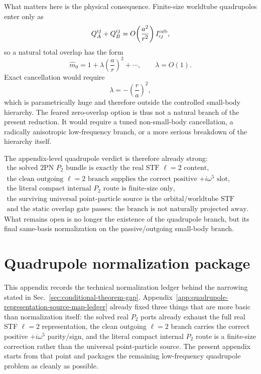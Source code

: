 \documentclass[11pt]{article}
\begin{document}
What matters here is the physical consequence.  Finite-size worldtube
quadrupoles enter only as
\[
Q_A^{ij}+Q_B^{ij}=O\!\left(\frac{a^2}{r^2}\right)I_{ij}^{\rm orb},
\]
so a natural total overlap has the form
\[
\hat m_0
=
1+\lambda\left(\frac{a}{r}\right)^2+\cdots,
\qquad \lambda=O(1).
\]
Exact cancellation would require
\[
\lambda=-\left(\frac{r}{a}\right)^2,
\]
which is parametrically huge and therefore outside the controlled small-body
hierarchy.  The feared zero-overlap option is thus not a natural branch of the
present reduction.  It would require a tuned non-small-body cancellation, a
radically anisotropic low-frequency branch, or a more serious breakdown of the
hierarchy itself.

The appendix-level quadrupole verdict is therefore already strong:
\[
\boxed{\begin{gathered}
\text{the solved $2$PN $P_2$ bundle is exactly the real STF $\ell=2$ content,}\\
\text{the clean outgoing $\ell=2$ branch supplies the correct positive $+i\omega^5$ slot,}\\
\text{the literal compact internal $P_2$ route is finite-size only,}\\
\text{the surviving universal point-particle source is the orbital/worldtube STF quadrupole,}\\
\text{and the static overlap gate passes: the branch is not naturally projected away.}
\end{gathered}}
\]
What remains open is no longer the existence of the quadrupole branch, but its
final same-basis normalization on the passive/outgoing small-body branch.


\section{Quadrupole normalization package}
\label{app:quadrupole-normalization-package}

This appendix records the technical normalization ledger behind the narrowing
stated in Sec.~\ref{sec:conditional-theorem-gap}.
Appendix~\ref{app:quadrupole-representation-source-map-ledger} already fixed
three things that are more basic than normalization itself: the solved real
$P_2$ ports already exhaust the full real STF $\ell=2$ representation, the
clean outgoing $\ell=2$ branch carries the correct positive
$+i\omega^5$ parity/sign, and the literal compact internal $P_2$ route is a
finite-size correction rather than the universal point-particle source.  The
present appendix starts from that point and packages the remaining low-frequency
quadrupole problem as cleanly as possible.
\end{document}
